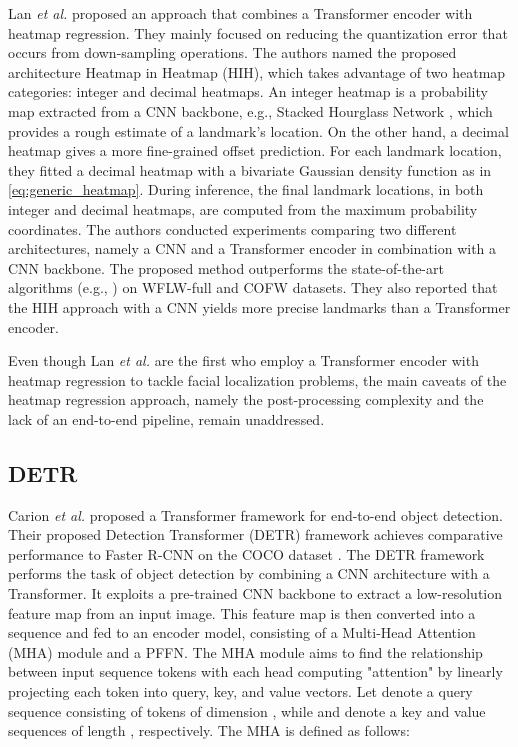 \documentclass[journal]{IEEEtran}
\begin{document}
Lan \textit{et al.} \cite{lan2021hih} proposed an approach that combines a Transformer encoder with heatmap regression.
They mainly focused on reducing the quantization error that occurs from down-sampling operations. 
The authors named the proposed architecture Heatmap in Heatmap (HIH), which takes advantage of two heatmap categories: integer and decimal heatmaps.
An integer heatmap is a probability map extracted from a CNN backbone, e.g., Stacked Hourglass Network \cite{Newell2016}, which provides a rough estimate of a landmark's location.
On the other hand, a decimal heatmap gives a more fine-grained offset prediction. 
For each landmark location, they fitted a decimal heatmap with a bivariate Gaussian density function as in \eqref{eq:generic_heatmap}.
During inference, the final landmark locations, in both integer and decimal heatmaps, are computed from the maximum probability coordinates.
The authors conducted experiments comparing two different architectures, namely a CNN and a Transformer encoder in combination with a CNN backbone.
The proposed method outperforms the state-of-the-art algorithms (e.g., \cite{Wu2018, Wang2019c, Kumar2020, Feng2017}) on WFLW-full \cite{Wu2018} and COFW \cite{Burgos2013} datasets.
They also reported that the HIH approach with a CNN yields more precise landmarks than a Transformer encoder.

Even though Lan \textit{et al.} \cite{lan2021hih} are the first who employ a Transformer encoder with heatmap regression to tackle facial localization problems, the main caveats of the heatmap regression approach, namely the post-processing complexity and the lack of an end-to-end pipeline, remain unaddressed.

\subsection{DETR}\label{subsec:detr}
Carion \textit{et al.} \cite{Carion2020} proposed a Transformer \cite{Vaswani} framework for end-to-end object detection.
Their proposed Detection Transformer (DETR) framework achieves comparative performance to Faster R-CNN \cite{girshick2014rich} on the COCO dataset \cite{lin2014}.
The DETR framework performs the task of object detection by combining a CNN architecture with a Transformer.
It exploits a pre-trained CNN backbone to extract a low-resolution feature map from an input image.
This feature map is then converted into a sequence and fed to an encoder model, consisting of a Multi-Head Attention (MHA) module and a PFFN.
The MHA module aims to find the relationship between input sequence tokens with each head computing "attention" by linearly projecting each token into query, key, and value vectors.
Let  denote a query sequence consisting of  tokens of dimension , while  and  denote a key and value sequences of length , respectively. 
The MHA is defined as follows:
\end{document}
